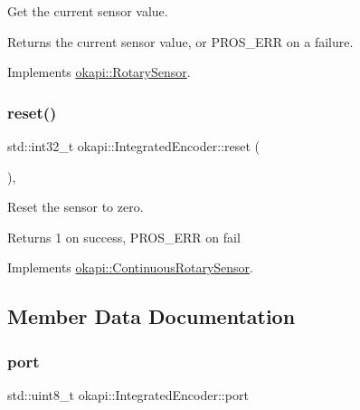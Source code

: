 Get the current sensor value.

\begin{DoxyReturn}{Returns}
the current sensor value, or {\ttfamily P\+R\+O\+S\+\_\+\+E\+RR} on a failure. 
\end{DoxyReturn}


Implements \mbox{\hyperlink{classokapi_1_1RotarySensor_ac5534dc6c3bcbd8ea2f4e54a04cda734}{okapi\+::\+Rotary\+Sensor}}.

\mbox{\label{classokapi_1_1IntegratedEncoder_a1f95f00f59911a87a9a38633343f4311}} 
\subsubsection{\texorpdfstring{reset()}{reset()}}
{\footnotesize\ttfamily std\+::int32\+\_\+t okapi\+::\+Integrated\+Encoder\+::reset (\begin{DoxyParamCaption}{ }\end{DoxyParamCaption})\hspace{0.3cm}{\ttfamily [override]}, {\ttfamily [virtual]}}

Reset the sensor to zero.

\begin{DoxyReturn}{Returns}
1 on success, P\+R\+O\+S\+\_\+\+E\+RR on fail 
\end{DoxyReturn}


Implements \mbox{\hyperlink{classokapi_1_1ContinuousRotarySensor_ae7268b0603097ac2d93a67e4fefa43e0}{okapi\+::\+Continuous\+Rotary\+Sensor}}.



\subsection{Member Data Documentation}
\mbox{\label{classokapi_1_1IntegratedEncoder_a1eb50864ff5509d1d11073325f2353fa}} 
\subsubsection{\texorpdfstring{port}{port}}
{\footnotesize\ttfamily std\+::uint8\+\_\+t okapi\+::\+Integrated\+Encoder\+::port\hspace{0.3cm}{\ttfamily [protected]}}

